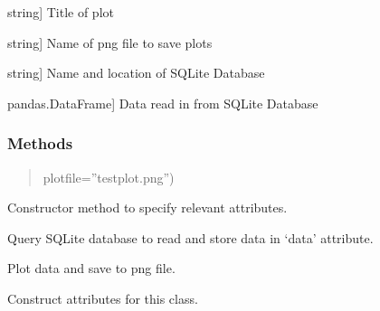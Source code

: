 \documentclass[letterpaper,10pt,english]{sphinxmanual}
\begin{document}
\begin{fulllineitems}
\begin{description}
\sphinxlineitem{title}{[}string{]}
\sphinxAtStartPar
Title of plot

\sphinxlineitem{fname}{[}string{]}
\sphinxAtStartPar
Name of png file to save plots

\sphinxlineitem{\_dbcon}{[}string{]}
\sphinxAtStartPar
Name and location of SQLite Database

\sphinxlineitem{data}{[}pandas.DataFrame{]}
\sphinxAtStartPar
Data read in from SQLite Database

\end{description}


\subsubsection{Methods}
\label{\detokenize{_autosummary/functionfinder.classes.projectdata:methods}}\begin{description}
\begin{quote}

\sphinxAtStartPar
plotfile=”testplot.png”)
\end{quote}

\sphinxAtStartPar
Constructor method to specify relevant attributes.

\sphinxAtStartPar
Query SQLite database to read and store data in ‘data’ attribute.

\sphinxAtStartPar
Plot data and save to png file.

\end{description}

\begin{fulllineitems}
\label{\detokenize{_autosummary/functionfinder.classes.projectdata:functionfinder.classes.projectdata.__init__}}
\pysigstartsignatures
{}
\pysigstopsignatures
\sphinxAtStartPar
Construct attributes for this class.



\end{fulllineitems}
\end{fulllineitems}
\end{document}
